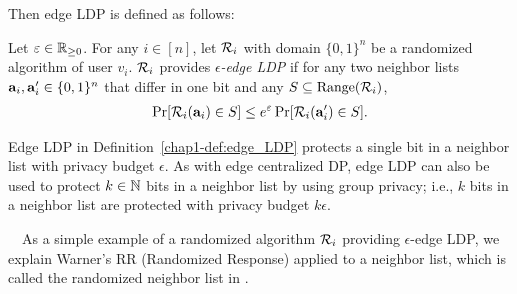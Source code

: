 Then edge LDP is defined as follows: 

\begin{definition}  \label{chap1-def:edge_LDP} 
Let $\varepsilon \in \mathbb{R}_{\ge0}$. 
For any $i \in [n]$, let $\mathcal{R}_i$ with domain $\{0,1\}^n$ be a randomized algorithm of user $v_i$. 
$\mathcal{R}_i$ 
provides \emph{$\epsilon$-edge LDP} 
if for any two neighbor lists 
$\mathbf{a}_i, \mathbf{a}'_i \in \{0,1\}^n$ 
that differ in one bit and any 
$S \subseteq \mathrm{Range}(\mathcal{R}_i)$, 
\begin{align}
\Pr[\mathcal{R}_i(\mathbf{a}_i) \in S] \leq e^\varepsilon \Pr[\mathcal{R}_i(\mathbf{a}'_i) \in S].
\label{chap1-eq:edge_LDP}
\end{align}
\end{definition}
Edge LDP in Definition~\ref{chap1-def:edge_LDP} protects 
a single bit in a neighbor list with privacy budget $\epsilon$. 
As with edge centralized DP, edge LDP can also be 
used 
to protect $k \in \mathbb{N}$ 
bits in a neighbor list 
by using group privacy; i.e., $k$ bits in a neighbor list are protected with privacy budget $k\epsilon$. 


\smallskip
~~As a simple example of a randomized algorithm 
$\mathcal{R}_i$ 
providing $\epsilon$-edge LDP, we explain 
Warner's RR (Randomized Response) \cite{Warner_JASA65} applied to a neighbor list, 
which is called 
the randomized neighbor list in \cite{qin2017generating}. 

